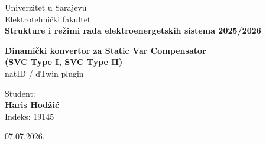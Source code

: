 \documentclass[11pt,a4paper]{report}
\begin{document}
\begin{titlepage}
\begin{flushleft}
Univerzitet u Sarajevu\\
Elektrotehnički fakultet\\
\textbf{Strukture i režimi rada elektroenergetskih sistema 2025/2026}
\end{flushleft}

\vspace{6cm}

\begin{center}
{\LARGE \textbf{Dinamički konvertor za Static Var Compensator\\[0.3em] (SVC Type I, SVC Type II)}}\\[0.8em]
{\large natID / dTwin plugin}
\end{center}

\vspace{6cm}

\begin{flushright}
Student:\\
\textbf{Haris Hodžić}\\
Indeks: 19145
\end{flushright}

\vfill

07.07.2026.

\end{titlepage}

\begin{abstract}
Ovaj rad opisuje dizajn i implementaciju dinamičkog konvertora za \emph{Static Var
Compensator} (SVC) uređaje, u obliku plugina (dll) za platformu \textbf{dTwin}, izgrađenog
korištenjem \textbf{natID} okvira (Izudin Dzafic). Konvertor učitava mrežu opisanu u
MATPOWER formatu (\texttt{case9}, \texttt{case30}, \texttt{case118}, \texttt{case300}) i
XML konfiguracijski fajl koji određuje koji čvor (bus) treba biti modeliran kao SVC Type I
(model preko ugla paljenja tiristora), koji kao SVC Type II (model preko susceptanse), a
koji zadržava svoj standardni statički (Slack/PV/PQ) model. Rezultat je diferencijalno-
algebarski (DAE) model u dTwin-ovom \texttt{.dmodl} formatu, spreman za vremensku
simulaciju. Sve matrične operacije koriste natID-ove \texttt{dense} i \texttt{sparse}
matrice; GUI je izgrađen pomoću natGUI biblioteke; konverzija se izvršava u odvojenom
thread-u dok GUI thread u realnom vremenu prikazuje napredak.
\end{abstract}

\tableofcontents

\end{document}
